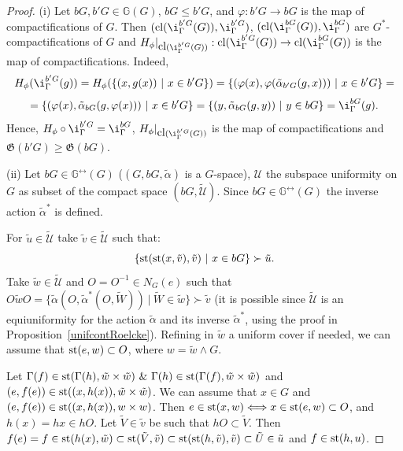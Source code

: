 \documentclass{amsart}
\newcommand{\cl}{\mbox{{\rm cl}}}
\newcommand{\st}{\mbox{{\rm st}}}
\begin{document}
\begin{proof}
(i) Let $b G, b' G\in\mathbb{G} (G)$, $b G\leq b' G$, and $\varphi: b' G\to b G$ is the map of compactifications of $G$. Then $(\cl (\i^{b' G}_{\Gamma} (G)), \i^{b' G}_{\Gamma})$, $(\cl (\i^{b G}_{\Gamma} (G)), \i^{b G}_{\Gamma})$ are $G^*$-compactifications of $G$ and $H_{\phi}|_{\cl (\i^{b' G}_{\Gamma} (G))}: \cl (\i^{b' G}_{\Gamma} (G))\to \cl (\i^{b G}_{\Gamma} (G))$ is the map of compactifications. Indeed, 
$$H_{\phi} (\i^{b' G}_{\Gamma}(g))=H_{\phi} (\{(x, g(x))\ |\ x\in b'G\})=\{(\varphi (x), \varphi (\tilde\alpha_{b' G} (g, x)))\ |\ x\in b' G\}=$$
$$=\{(\varphi (x), \tilde\alpha_{b G} (g, \varphi (x)))\ |\ x\in b'G\}= \{(y, \tilde\alpha_{b G} (g, y))\ |\ y\in b G\}=\i^{b G}_{\Gamma}(g).$$
Hence, $H_{\phi}\circ\i^{b' G}_{\Gamma}=\i^{b G}_{\Gamma}$, $H_{\phi}|_{\cl (\i^{b' G}_{\Gamma}(G))}$ is the map of compactifications and $\mathfrak{G} (b' G)\geq \mathfrak{G} (b G)$.

\medskip 

(ii) Let $b G\in\mathbb{G}^{\leftrightarrow} (G)$ ($(G, b G, \tilde\alpha)$ is a $G$-space), $\mathcal U$ the subspace uniformity on $G$ as subset of the compact space $(b G, \tilde{\mathcal U})$. Since $ b G\in \mathbb{G}^{\leftrightarrow} (G)$ the inverse action $\tilde\alpha^*$ is defined. 

For $\tilde u\in\tilde{\mathcal U}$ take $\tilde v\in\tilde{\mathcal U}$ such that:
$$\{\st (\st (x, \tilde v), \tilde v)\ |\ x\in b G\}\succ\tilde u.$$
Take $\tilde w\in\tilde{\mathcal U}$  and $O=O^{-1}\in N_G (e)$ such that $O\tilde wO=\{\tilde\alpha (O, \tilde\alpha^* (O, \tilde W))\ |\ \tilde W\in\tilde w\}\succ\tilde v$ (it is possible since $\tilde{\mathcal U}$ is an equiuniformity for the action $\tilde\alpha$ and its inverse $\tilde\alpha^*$, using the proof in  Proposition~\ref{unifcontRoelcke}). Refining in $\tilde w$ a uniform cover if needed, we can assume that $\st (e, w)\subset O$, where $w=\tilde w\wedge G$. 

Let $\Gamma (f)\in\st(\Gamma (h), \tilde w\times\tilde w)\ \&\ \Gamma (h)\in\st(\Gamma (f), \tilde w\times\tilde w)$ and $(e, f(e))\in\st ((x, h(x)), \tilde w\times\tilde w)$. We can assume that $x\in G$ and $(e, f(e))\in\st ((x, h(x)), w\times w)$. Then $e\in\st (x, w)\Longleftrightarrow x\in\st (e, w)\subset O$, and $h(x)=hx\in hO$. Let $\tilde V\in\tilde v$ be such that $hO\subset\tilde V$. Then $f(e)=f\in\st (h(x), \tilde w)\subset\st (\tilde V, \tilde v)\subset\st (\st (h, \tilde v), \tilde v)\subset \tilde U\in\tilde u$ and $f\in \st (h, u)$. 


\end{proof}
\end{document}
